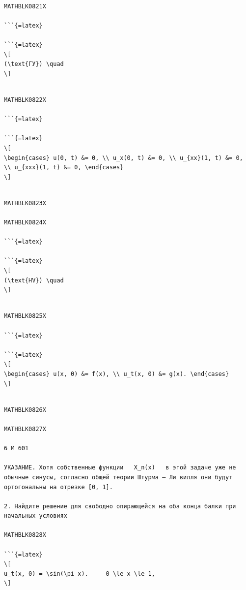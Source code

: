 \documentclass[
]{article}
\begin{document}
\begin{verbatim}

MATHBLK0821X

```{=latex}

```{=latex}
\[
(\text{ГУ}) \quad
\]
\end{verbatim}

\begin{verbatim}

MATHBLK0822X

```{=latex}

```{=latex}
\[
\begin{cases} u(0, t) &= 0, \\ u_x(0, t) &= 0, \\ u_{xx}(1, t) &= 0, \\ u_{xxx}(1, t) &= 0, \end{cases}
\]
\end{verbatim}

\begin{verbatim}

MATHBLK0823X

MATHBLK0824X

```{=latex}

```{=latex}
\[
(\text{HV}) \quad
\]
\end{verbatim}

\begin{verbatim}

MATHBLK0825X

```{=latex}

```{=latex}
\[
\begin{cases} u(x, 0) &= f(x), \\ u_t(x, 0) &= g(x). \end{cases}
\]
\end{verbatim}

\begin{verbatim}

MATHBLK0826X

MATHBLK0827X

6 M 601

УКАЗАНИЕ. Хотя собственные функции   X_n(x)   в этой задаче уже не обычные синусы, согласно общей теории Штурма — Ли вилля они будут ортогональны на отрезке [0, 1].

2. Найдите решение для свободно опирающейся на оба конца балки при начальных условиях

MATHBLK0828X

```{=latex}
\[
u_t(x, 0) = \sin(\pi x).     0 \le x \le 1,
\]
\end{verbatim}
\end{document}
